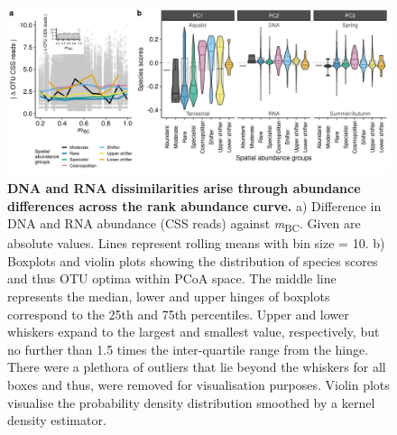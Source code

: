 \documentclass[12pt,a4paper]{article} %
\begin{document}
\begin{figure}[!ht]
\centering
\includegraphics[width=15cm]{../../Figures/Final/abgroups_rollmean_violin}
\caption{\textbf{DNA and RNA dissimilarities arise through abundance differences across the rank abundance curve.} a) Difference in DNA and RNA abundance (CSS reads) against \textit{m}\textsubscript{BC}. Given are absolute values. Lines represent rolling means with bin size = 10. b) Boxplots and violin plots showing the distribution of species scores and thus OTU optima within PCoA space. The middle line represents the median, lower and upper hinges of boxplots correspond to the 25th and 75th percentiles. Upper and lower whiskers expand to the largest and smallest value, respectively, but no further than 1.5 times the inter-quartile range from the hinge. There were a plethora of outliers that lie beyond the whiskers for all boxes and thus, were removed for visualisation purposes. Violin plots visualise the probability density distribution smoothed by a kernel density estimator.}
\end{figure}
\end{document}
